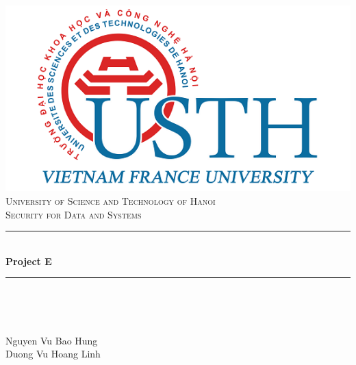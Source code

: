 \documentclass{article}
\title{}
\author{Linh Duong, Hung Nguyen }
\date{}
\begin{document}
\begin{titlepage}
	\centering
    \includegraphics[scale = 0.75]{usthlogo}\\[1.0 cm]	%
    \textsc{\large University of Science and Technology of Hanoi}\\[1.5cm] %
    \textsc{\Large Security for Data and Systems}\\[0.5cm] %
	\rule{\linewidth}{0.2 mm} \\[0.4 cm]
    { \huge \bfseries Project E}\\[0.4cm] %
	\rule{\linewidth}{0.2 mm} \\[1.5 cm]
	\begin{minipage}{0.6\textwidth}
		\begin{flushleft} \large
			\end{flushleft}
			\end{minipage}~
			\begin{minipage}{0.4\textwidth}
            
			\begin{flushright} \large
			\bigskip
			\bigskip
			\bigskip
			Nguyen Vu Bao Hung \\
			Duong Vu Hoang Linh
		
			\bigskip
		\end{flushright}
        
	\end{minipage}\\[2 cm]
	
	
\end{titlepage}
\end{document}
